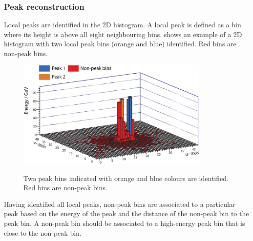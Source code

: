 
\subsubsection{Peak reconstruction}

Local peaks are identified in the 2D histogram. A local peak is defined as a bin where its height is above all eight neighbouring bins.  shows an example of a 2D histogram with two local peak bins (orange and blue) identified. Red bins are non-peak bins.




\begin{figure}[tbph]
\centering
{\includegraphics[width=0.85\textwidth]{photon/peakFindingPeakOnly}}
\caption[Example of projecting a large photon cluster containing two photons.]
{Two peak bins indicated with orange and blue colours are identified. Red bins are non-peak bins.}
\label{fig:photonPeakFindingPeakOnly}
\end{figure}



Having identified all local peaks,  non-peak bins  are associated to a particular peak based on the energy of the peak and the distance of the non-peak bin to the peak bin. A non-peak bin should be associated to a high-energy peak bin that is close to the non-peak bin.

